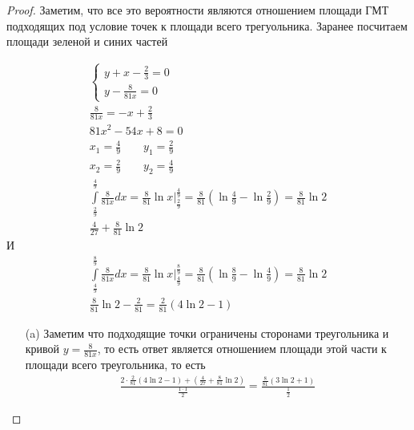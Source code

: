     \begin{proof}
        Заметим, что все это вероятности являются отношением площади ГМТ подходящих под условие точек к площади всего трегуольника. Заранее посчитаем площади зеленой и синих частей
        \begin{figure}[h]
        \end{figure}
        \begin{gather*}
            \begin{cases}
                y + x - \frac{2}{3} = 0\\
                y - \frac{8}{81 x} = 0
            \end{cases}\\
            \frac{8}{81 x} = -x + \frac{2}{3}\\
            81x^2 - 54x + 8 = 0\\
            x_1 = \frac{4}{9}\qquad y_1 = \frac{2}{9}\\
            x_2 = \frac{2}{9}\qquad y_2 = \frac{4}{9}\\
            \int\limits_{\frac{2}{9}}^{\frac{4}{9}} \frac{8}{81x} dx
            = \frac{8}{81} \ln x \bigg|_{\frac{2}{9}}^{\frac{4}{9}}
            = \frac{8}{81} (\ln \frac{4}{9} - \ln \frac{2}{9})
            = \frac{8}{81}\ln 2\\
            \frac{4}{27} + \frac{8}{81} \ln 2 
        \end{gather*}
        И
        \begin{gather*}
            \int\limits_{\frac{4}{9}}^{\frac{8}{9}} \frac{8}{81 x} dx
            = \frac{8}{81} \ln x \bigg|_{\frac{4}{9}}^{\frac{8}{9}}
            = \frac{8}{81} \left(\ln \frac{8}{9} - \ln \frac{4}{9}\right)
            = \frac{8}{81} \ln 2\\
            \frac{8}{81} \ln 2 - \frac{2}{81} = \frac{2}{81} (4\ln 2 - 1)
        \end{gather*}
        \begin{itemize}
            \item[(a)] Заметим что подходящие точки ограничены сторонами треугольника и кривой $y = \frac{8}{81 x}$, то есть ответ является отношением площади этой части к площади всего треугольника, то есть
            \begin{gather*}
                \frac{2 \cdot \frac{2}{81}(4 \ln 2 - 1) + \left(\frac{4}{27} + \frac{8}{81} \ln 2\right)}{\frac{1 \cdot 1}{2}}
                = \frac{\frac{8}{81}\left(3 \ln 2 + 1\right)}{\frac{1}{2}}

\end{gather*}
\end{itemize}
\end{proof}

